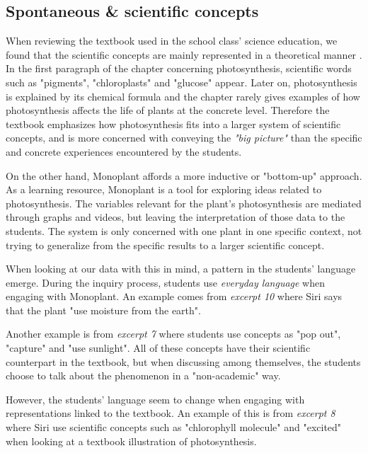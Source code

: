 \subsection{Spontaneous \& scientific concepts}
When reviewing the textbook used in the school class' science education, we found that the scientific concepts are mainly represented in a theoretical manner \citep{bios}. In the first paragraph of the chapter concerning photosynthesis, scientific words such as "pigments", "chloroplasts" and "glucose" appear. Later on, photosynthesis is explained by its chemical formula and the chapter rarely gives examples of how photosynthesis affects the life of plants at the concrete level. Therefore the textbook emphasizes how photosynthesis fits into a larger system of scientific concepts, and is more concerned with conveying the \emph{"big picture"} than the specific and concrete experiences encountered by the students. 

On the other hand, Monoplant affords a more inductive or "bottom-up" approach. As a learning resource, Monoplant is a tool for exploring ideas related to photosynthesis. The variables relevant for the plant's photosynthesis are mediated through graphs and videos, but leaving the interpretation of those data to the students. The system is only concerned with one plant in one specific context, not trying to generalize from the specific results to a larger scientific concept. 

When looking at our data with this in mind, a pattern in the students' language emerge. During the inquiry process, students use \emph{everyday language} when engaging with Monoplant. An example comes from \emph{excerpt 10} where Siri says that the plant "use moisture from the earth". 

Another example is from \emph{excerpt 7} where students use concepts as "pop out", "capture" and "use sunlight". All of these concepts have their scientific counterpart in the textbook, but when discussing among themselves, the students choose to talk about the phenomenon in a "non-academic" way. 

However, the students' language seem to change when engaging with representations linked to the textbook. An example of this is from \emph{excerpt 8} where Siri use scientific concepts such as "chlorophyll molecule" and "excited" when looking at a textbook illustration of photosynthesis. 

